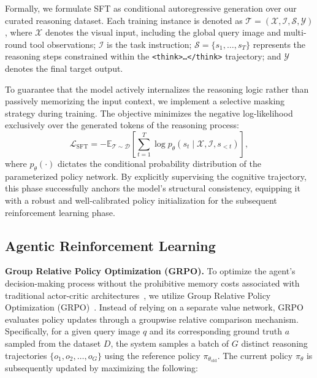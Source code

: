 \documentclass{llmxive}
\begin{document}
Formally, we formulate SFT as conditional autoregressive generation over our curated reasoning dataset. Each training instance is denoted as $\mathcal{T} = (\mathcal{X}, \mathcal{I}, \mathcal{S}, \mathcal{Y})$, where $\mathcal{X}$ denotes the visual input, including the global query image and multi-round tool observations; $\mathcal{I}$ is the task instruction; $\mathcal{S}=\{s_1,\dots,s_T\}$ represents the reasoning steps constrained within the \texttt{<think>\dots</think>} trajectory; and $\mathcal{Y}$ denotes the final target output.

To guarantee that the model actively internalizes the reasoning logic rather than passively memorizing the input context, we implement a selective masking strategy during training. The objective minimizes the negative log-likelihood exclusively over the generated tokens of the reasoning process:
\begin{equation}
\mathcal{L}_{\text{SFT}} = -\mathbb{E}_{\mathcal{T} \sim \mathcal{D}} \left[ \sum_{t=1}^{T} \log p_{\theta}(s_t \mid \mathcal{X}, \mathcal{I}, s_{<t}) \right],
\end{equation}
where $p_{\theta}(\cdot)$ dictates the conditional probability distribution of the parameterized policy network. By explicitly supervising the cognitive trajectory, this phase successfully anchors the model's structural consistency, equipping it with a robust and well-calibrated policy initialization for the subsequent reinforcement learning phase.

\subsection{Agentic Reinforcement Learning}
\label{sec:RL}

\textbf{Group Relative Policy Optimization (GRPO).}
To optimize the agent's decision-making process without the prohibitive memory costs associated with traditional actor-critic architectures~\citep{schulman2017proximal}, we utilize Group Relative Policy Optimization (GRPO)~\citep{shao2024deepseekmath}. Instead of relying on a separate value network, GRPO evaluates policy updates through a groupwise relative comparison mechanism.
Specifically, for a given query image $ q $ and its corresponding ground truth $ a $ sampled from the dataset $ D $, the system samples a batch of $ G $ distinct reasoning trajectories $ \{o_1, o_2, \dots, o_G\} $ using the reference policy $ \pi_{\theta_{\text{old}}} $. The current policy $ \pi_\theta $ is subsequently updated by maximizing the following:  
\end{document}
